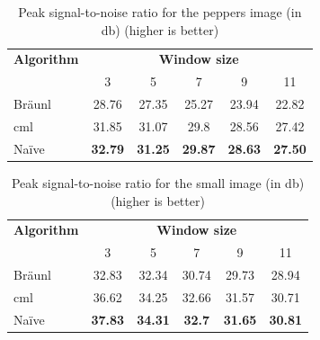 \begin{table}
\centering
\caption[Peak signal-to-noise for the peppers image]{Peak signal-to-noise ratio for the peppers image (in \unit{\decibel}) (higher is better)}
\begin{tabular}{@{}lccccc@{}}
\toprule
\multicolumn{1}{c}{\textbf{Algorithm}} & \multicolumn{5}{c}{\textbf{Window size}}                                          \\
                                       & 3              & 5              & 7              & 9              & 11            \\ \midrule
Bräunl                                 & 28.76          & 27.35          & 25.27          & 23.94          & 22.82         \\
\gls{cml}                                    & 31.85          & 31.07          & 29.8           & 28.56          & 27.42         \\
Naïve                                  & \textbf{32.79} & \textbf{31.25} & \textbf{29.87} & \textbf{28.63} & \textbf{27.50} \\ \bottomrule
\end{tabular}
\label{tab:median:psnrpeppers}
\end{table}

\begin{table}
\centering
\caption[Peak signal-to-noise for the small image]{Peak signal-to-noise ratio for the small image (in \unit{\decibel}) (higher is better)}
\label{tab:median:psnrsmall}
\begin{tabular}{@{}lccccc@{}}
\toprule
\multicolumn{1}{c}{\textbf{Algorithm}} & \multicolumn{5}{c}{\textbf{Window size}}                                          \\
                                       & 3              & 5              & 7             & 9              & 11             \\ \midrule
Bräunl                                 & 32.83          & 32.34          & 30.74         & 29.73          & 28.94          \\
\gls{cml}                                    & 36.62          & 34.25          & 32.66         & 31.57          & 30.71          \\
Naïve                                  & \textbf{37.83} & \textbf{34.31} & \textbf{32.7} & \textbf{31.65} & \textbf{30.81} \\ \bottomrule
\end{tabular}
\end{table}

